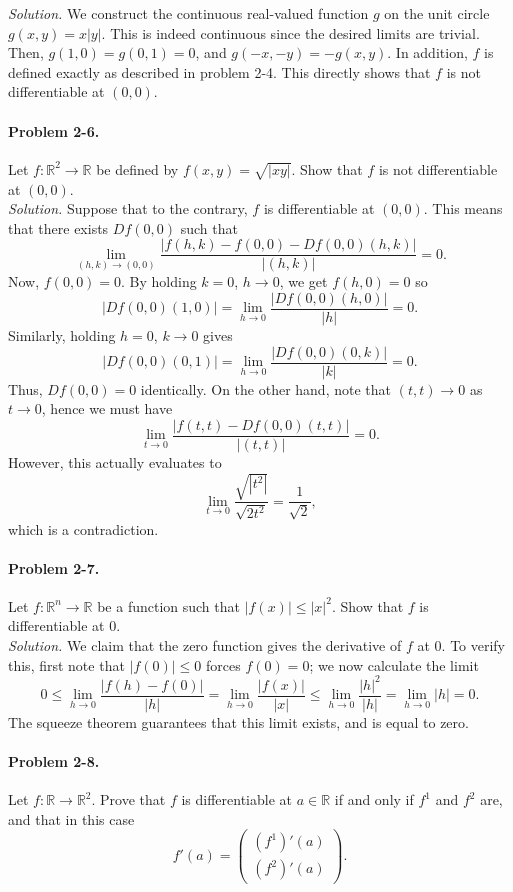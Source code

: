 \documentclass[11pt]{report}
\newcommand{\R}{\mathbb{R}}
\newcommand{\problem}[1]{\paragraph{Problem #1.}}
\newcommand{\solution}{\noindent\textit{Solution.} }
\begin{document}
    \solution We construct the continuous real-valued function $g$ on the unit circle
    $g(x, y) = x|y|$. This is indeed continuous since the desired limits are trivial.
    Then, $g(1, 0) = g(0, 1) = 0$, and $g(-x, -y) = -g(x, y)$. In addition, $f$ is
    defined exactly as described in problem 2-4. This directly shows that $f$ is not
    differentiable at $(0, 0)$.


    \problem{2-6} Let $f\colon \R^2 \to \R$ be defined by $f(x, y) = \sqrt{|xy|}$.
    Show that $f$ is not differentiable at $(0, 0)$. \\

    \solution Suppose that to the contrary, $f$ is differentiable at $(0, 0)$. This
    means that there exists $Df(0, 0)$ such that \[
        \lim_{(h, k) \to (0, 0)} \frac{|f(h, k) - f(0, 0) - Df(0, 0)(h,
        k)|}{|(h, k)|} = 0.
    \] Now, $f(0, 0) = 0$. By holding $k = 0$, $h \to 0$, we get $f(h, 0) = 0$ so \[
            |Df(0, 0)(1, 0)| = \lim_{h \to 0} \frac{|Df(0, 0)(h, 0)|}{|h|} = 0.
    \] Similarly, holding $h = 0$, $k \to 0$ gives \[
            |Df(0, 0)(0, 1)| = \lim_{h \to 0} \frac{|Df(0, 0)(0, k)|}{|k|} = 0.
    \] Thus, $Df(0, 0) = 0$ identically. On the other hand, note that $(t, t) \to 0$
    as $t \to 0$, hence we must have \[
        \lim_{t \to 0} \frac{|f(t, t) - Df(0, 0)(t, t)|}{|(t, t)|} = 0.
    \] However, this actually evaluates to \[
        \lim_{t \to 0} \frac{\sqrt{|t^2|}}{\sqrt{2t^2}} = \frac{1}{\sqrt{2}},
    \] which is a contradiction.


    \problem{2-7} Let $f\colon \R^n \to \R$ be a function such that $|f(x)| \leq
    |x|^2$. Show that $f$ is differentiable at $0$. \\

    \solution We claim that the zero function gives the derivative of $f$ at $0$. To
    verify this, first note that $|f(0)| \leq 0$ forces $f(0) = 0$; we now calculate
    the limit \[
        0 \leq \lim_{h \to 0} \frac{|f(h) - f(0)|}{|h|} = \lim_{h \to 0}
        \frac{|f(x)|}{|x|} \leq \lim_{h \to 0} \frac{|h|^2}{|h|} = \lim_{h \to 0} |h|
        = 0.
    \] The squeeze theorem guarantees that this limit exists, and is equal to zero.


    \problem{2-8} Let $f\colon \R \to \R^2$. Prove that $f$ is differentiable at
    $a \in \R$ if and only if $f^1$ and $f^2$ are, and that in this case \[
        f'(a) = \begin{pmatrix}
            (f^1)'(a) \\ (f^2)'(a)
        \end{pmatrix}.
    \] 
\end{document}
